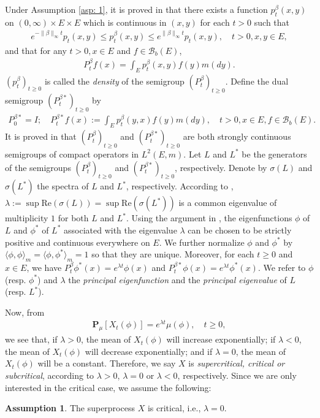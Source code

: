 \documentclass[UTF8]{pkuthss}
\theoremstyle{plain}
\theoremstyle{definition}
\newtheorem{asp}{Assumption}[chapter]
\numberwithin{equation}{section}
\begin{document}
	Under Assumption \ref{asp: 1}, it is proved in
	\cite{RenSongZhang2015Limit, RenSongZhang2017Central}
	that there exists a function $p^\beta_t(x,y)$ on $(0,\infty) \times E \times E$ which is continuous in $(x,y)$ for each $t>0$ such that
\begin{align}
	e^{-\|\beta\|_\infty t} p_t(x,y)
	\leq p^{\beta}_t(x,y)
	\leq e^{\|\beta\|_\infty t} p_t(x,y),
	\quad t>0, x, y\in E,
\end{align}
	and that for any $t>0, x\in E$ and $f \in \mathscr B_b(E)$,
\begin{align}
	P^\beta_t f(x)
	= \int_E p_t^\beta (x,y) f(y) m(dy).
\end{align}
    $(p^\beta_t)_{t\geq 0}$ is called the
    \emph{density}  of the semigroup $(P^\beta_t)_{t\geq 0}$.
	Define the dual semigroup $(P^{\beta *}_t)_{t \geq 0}$ by
\begin{align}
	P^{\beta *}_0 = I;
	\quad P^{\beta *}_t f(x)
	:= \int_E p^\beta_t (y,x) f(y) m(dy),
	\quad t>0, x\in E, f\in \mathscr B_b(E).
\end{align}
	It is proved in
	\cite{RenSongZhang2015Limit, RenSongZhang2017Central}
	that $(P^\beta_t)_{t \geq 0}$ and $(P^{\beta *}_t)_{t \geq 0}$ are both strongly continuous semigroups of compact operators in $L^2(E,m)$.
	Let $L$ and $L^*$ be the generators of the semigroups $(P^\beta_t)_{t \geq 0}$ and $(P^{\beta *}_t)_{t \geq 0}$, respectively.
	Denote by $\sigma(L)$ and $\sigma(L^*)$ the spectra of $L$ and $L^*$, respectively.
	According to \cite[Theorem V.6.6]{Schaefer1974Banach},
	$\lambda := \sup \text{Re}(\sigma(L)) = \sup \text{Re}(\sigma(L^*))$ is a common eigenvalue of multiplicity $1$ for both $L$ and $L^*$.
	Using the argument in \cite{RenSongZhang2015Limit}, the eigenfunctions $\phi$ of $L$ and $\phi^*$ of $L^*$ associated with the eigenvalue $\lambda$ can be chosen to be strictly positive and continuous everywhere on $E$.
	We further normalize $\phi$ and $\phi^*$ by $\langle\phi, \phi\rangle_m = \langle\phi,\phi^*\rangle_m = 1$ so that they are unique.
	Moreover, for each $t\geq 0$ and $x\in E$, we have $P^\beta_t \phi^*(x) = e^{\lambda t} \phi(x)$ and $P^{\beta *}_t \phi(x) = e^{\lambda t} \phi^*(x)$.
	We refer to $\phi$ (resp. $\phi^*$) and $\lambda$ the \emph{principal eigenfunction} and the \emph{principal eigenvalue} of $L$ (resp. $L^*$).
	
	Now, from
\begin{align}
	\mathbf P_\mu[X_t(\phi)]
	= e^{\lambda t} \mu(\phi),
	\quad t \geq 0,
\end{align}
	we see that, if $\lambda > 0$, the mean of $X_t(\phi)$ will increase exponentially; if $\lambda < 0$, the mean of $X_t(\phi)$ will decrease exponentially; and if $\lambda = 0$, the mean of $X_t(\phi)$ will be a constant.
	Therefore, we say $X$ is \emph{supercritical, critical or subcritical}, according to $\lambda > 0$, $\lambda = 0$ or $\lambda < 0$, respectively.
	Since we are only interested in the critical case, we assume the following:
\begin{asp} \label{asp: 2}
    The superprocess $X$ is critical, i.e., $\lambda = 0$.
\end{asp}
\end{document}

